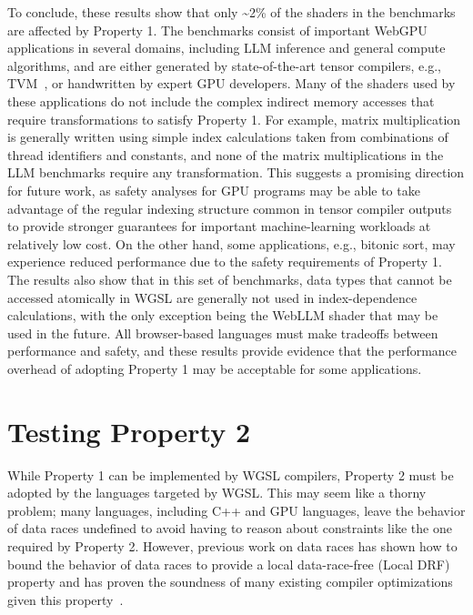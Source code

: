 To conclude, these results show that only \textasciitilde 2\% of the shaders in the benchmarks are affected by \smsg Property 1. The benchmarks consist of important WebGPU applications in several domains, including LLM inference and general compute algorithms, and are either generated by state-of-the-art tensor compilers, e.g., TVM~\cite{apache_tvm}, or handwritten by expert GPU developers. Many of the shaders used by these applications do not include the complex indirect memory accesses that require transformations to satisfy \smsg Property 1. For example, matrix multiplication is generally written using simple index calculations taken from combinations of thread identifiers and constants, and none of the matrix multiplications in the LLM benchmarks require any transformation. This suggests a promising direction for future work, as safety analyses for GPU programs may be able to take advantage of the regular indexing structure common in tensor compiler outputs to provide stronger guarantees for important machine-learning workloads at relatively low cost. On the other hand, some applications, e.g., bitonic sort, may experience reduced performance due to the safety requirements of \smsg Property 1. The results also show that in this set of benchmarks, data types that cannot be accessed atomically in WGSL are generally not used in index-dependence calculations, with the only exception being the WebLLM shader that may be used in the future. All browser-based languages must make tradeoffs between performance and safety, and these results provide evidence that the performance overhead of adopting \smsg Property 1 may be acceptable for some applications.

\section{Testing \smsg Property 2 \label{sec:saferace-smsg-prop-2}}

While \smsg Property 1 can be implemented by WGSL compilers, Property 2 must be adopted by the languages targeted by WGSL. This may seem like a thorny problem; many languages, including C++ and GPU languages, leave the behavior of data races undefined to avoid having to reason about constraints like the one required by Property 2. However, previous work on data races has shown how to bound the behavior of data races to provide a local data-race-free (Local DRF) property and has proven the soundness of many existing compiler optimizations given this property~\cite{dolan2018bounding}.

